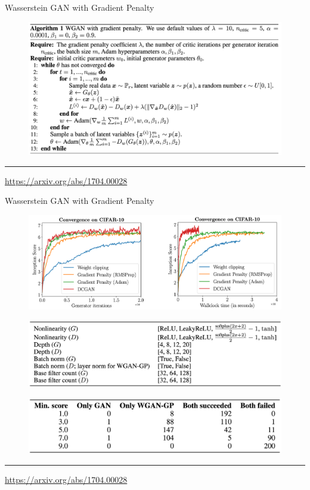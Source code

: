 \documentclass{beamer}
\begin{document}
\begin{frame}{Wasserstein GAN with Gradient Penalty}
	
	\begin{figure}
		\centering
		\includegraphics[width=1.0\linewidth]{figs/wgan_gp_pseudocode}
	\end{figure}
	
	\vfill
	\hrule\medskip 
	{\scriptsize \href{https://arxiv.org/abs/1704.00028}{https://arxiv.org/abs/1704.00028}}
	
\end{frame}
\begin{frame}{Wasserstein GAN with Gradient Penalty}
	\begin{figure}
		\centering
		\includegraphics[width=0.9\linewidth]{figs/wgan_gp_convergence}
	\end{figure}
	\begin{figure}
		\centering
		\includegraphics[width=0.65\linewidth]{figs/wgan_gp_model_space}
	\end{figure}
	\begin{figure}
		\centering
		\includegraphics[width=0.65\linewidth]{figs/wgan_gp_wgan}
	\end{figure}
	\vfill
	\hrule\medskip 
	{\scriptsize \href{https://arxiv.org/abs/1704.00028}{https://arxiv.org/abs/1704.00028}}
	
\end{frame}
\end{document}
